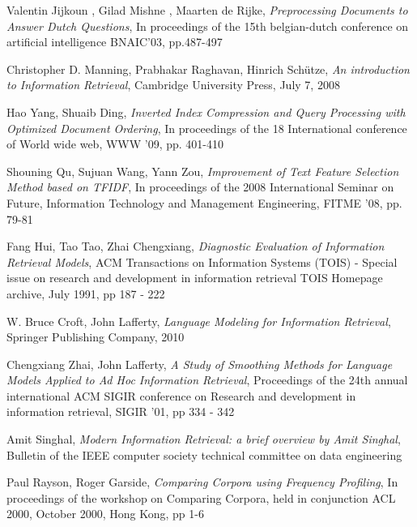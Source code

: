\begin{thebibliography}{99}

			Valentin Jijkoun , Gilad Mishne , Maarten de Rijke,
			\emph{Preprocessing Documents to Answer Dutch Questions},
			In proceedings of the 15th belgian-dutch conference on artificial intelligence
			BNAIC’03,
			pp.487-497

			Christopher D. Manning, Prabhakar Raghavan, Hinrich Schütze,
			\emph{An introduction to Information Retrieval},
			Cambridge University Press,
			July 7, 2008


			Hao Yang, Shuaib Ding,
			\emph{Inverted Index Compression and Query Processing with Optimized Document Ordering},
			In proceedings of the 18 International conference of World wide web,
			WWW '09,
			pp. 401-410

			Shouning Qu, Sujuan Wang, Yann Zou,
			\emph{Improvement of Text Feature Selection Method based on TFIDF},
			In proceedings of the 2008 International Seminar on Future,
			Information Technology and Management Engineering,
			FITME '08,
			pp. 79-81

			Fang Hui, Tao Tao, Zhai Chengxiang,
			\emph{Diagnostic Evaluation of Information Retrieval Models},
			ACM Transactions on Information Systems (TOIS) -
			Special issue on research and development in information retrieval TOIS Homepage archive,
			July 1991,
			pp 187 - 222


			W. Bruce Croft, John Lafferty,
			\emph{Language Modeling for Information Retrieval},
			Springer Publishing Company,
			2010

			Chengxiang Zhai, John Lafferty,
			\emph{A Study of Smoothing Methods for Language Models Applied to Ad Hoc Information Retrieval},
			Proceedings of the 24th annual international ACM SIGIR conference on Research and development in information retrieval,
			SIGIR '01,
			pp 334 - 342


			Amit Singhal,
			\emph{Modern Information Retrieval: a brief overview by Amit Singhal},
			Bulletin of the IEEE computer society technical committee on data engineering


			Paul Rayson, Roger Garside,
			\emph{Comparing Corpora using Frequency Profiling},
			In proceedings of the workshop on Comparing Corpora, held in conjunction ACL 2000,
			October 2000, Hong Kong,
			pp 1-6


\end{thebibliography}
